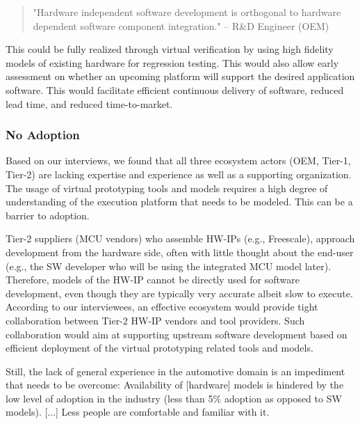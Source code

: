 \begin{quote}
"Hardware independent software development is orthogonal to hardware dependent software component integration."
-- R&D Engineer (OEM)
\end{quote}

This could be fully realized through virtual verification by using high fidelity models of existing hardware for regression testing. This would also allow early assessment on whether an upcoming platform will support the desired application software. This would facilitate efficient continuous delivery of software, reduced lead time, and reduced time-to-market.

\subsubsection{No Adoption}
Based on our interviews, we found that all three ecosystem actors (OEM, Tier-1, Tier-2) are lacking expertise and experience as well as a supporting organization.
The usage of virtual prototyping tools and models requires a high degree of understanding of the execution platform that needs to be modeled. This can be a barrier to adoption.

Tier-2 suppliers (MCU vendors) who assemble HW-IPs (e.g., Freescale), approach development from the hardware side, often with little thought about the end-user (e.g., the SW developer who will be using the integrated MCU model later). Therefore, models of the HW-IP cannot be directly used for software development, even though they are typically very accurate albeit slow to execute. According to our interviewees, an effective ecosystem would provide tight collaboration between Tier-2 HW-IP vendors and tool providers. Such collaboration would aim at supporting upstream software development based on efficient deployment of the virtual prototyping related tools and models.

Still, the lack of general experience in the automotive domain is an impediment that needs to be overcome:
Availability of [hardware] models is hindered by the low level of adoption in the industry (less than 5\% adoption as opposed to SW models). [...] Less people are comfortable and familiar with it.

